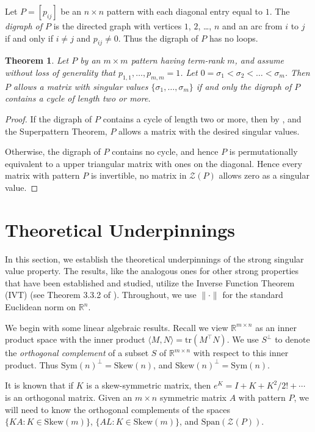 \documentclass[preprint,12pt]{elsarticle}
\newcommand{\trans  }{^\top}
\newcommand{\mat}{\mathbb{R}}
\newtheorem{theorem}{Theorem}[section]
\begin{document}
Let $P=[p_{ij}]$ be an $n\times n$ pattern with each diagonal entry equal to $1$. The 
{\it digraph of $P$} is the directed graph with vertices $1$, $2$, \ldots, $n$ 
and an arc from $i$ to $j$ 
if and only if $i\neq j$ and 
$p_{ij} \neq 0$.  Thus the digraph of $P$ has no loops. 
\begin{theorem}
Let $P$ by an $m\times m$ pattern having term-rank $m$, 
and assume without loss of generality that $p_{1,1}, \ldots, p_{m,m}=1$.
Let $0=\sigma_1< \sigma_2 < \dots< \sigma_m$. 
Then $P$ allows a matrix with singular values $\{\sigma_1, \ldots, \sigma_m\}$
if and only the digraph of $P$ contains a cycle of length two or more.
\end{theorem} 


\begin{proof}
If the digraph of $P$ contains a cycle of length two or more, then by ,  and the  Superpattern Theorem, $P$ allows a matrix with the desired singular values. 

Otherwise, the digraph of $P$ contains no cycle, and hence $P$ is permutationally 
equivalent to a upper triangular matrix with ones on the diagonal.  Hence every 
matrix with pattern $P$ is invertible,  no matrix in 
$\mathcal{Z}(P)$ 
allows zero as a singular value. 
\end{proof} 



\section{Theoretical Underpinnings}
\label{theory}
In this section, we establish the theoretical underpinnings of 
the strong singular value property. The results, like the 
analogous ones for other strong properties that have been established and studied, utilize the  Inverse Function Theorem (IVT) (see 
Theorem 3.3.2 of \cite{krantz2013}).  Throughout, we use 
$\| \cdot \|$ for the standard Euclidean  norm on $\mathbb{R}^n$.

We begin with some linear algebraic results.
Recall we view  $\mat^{m\times n}$ as an inner product space with the inner product $\langle M, N\rangle=\mbox{tr}(M\trans N)$.  We use $S^\perp$ to denote the \textit{orthogonal complement} of a subset $
S$ of $\mat^{m\times n}$ with respect to this inner product.  Thus $\mbox{Sym}(n)^{\perp}= \mbox{Skew}(n)$, and $\mbox{Skew}(n)^{\perp}= 
\mbox{Sym}(n)$.

It is known that if $K$ is a skew-symmetric matrix, 
then $e^{K}=I+K + K^2/2! + \cdots$
is an orthogonal matrix.   
Given an $m\times n$ symmetric matrix $A$ with pattern $P$, 
we will need to know the 
orthogonal complements of the 
spaces 
$\{ KA: K \in \mbox{Skew}(m)\}$, 
$\{ AL: K \in \mbox{Skew}(m)\}$, 
and $\mbox{Span} (\mathcal{Z}(P))$.
\end{document}
